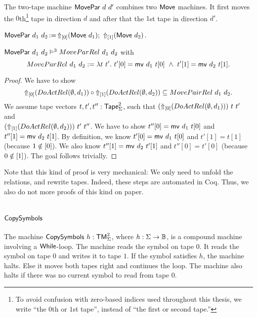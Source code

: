 The two-tape machine $\MS{MovePar}~d~d'$ combines two $\MS{Move}$ machines.  It first moves the $0$th\footnote{To avoid confusion with zero-based
  indices used throughout this thesis, we write ``the $0$th or $1$st tape'', instead of ``the first or second tape.''} tape in direction $d$ and after
that the $1$st tape in direction $d'$.
\begin{definition}[$\MS{MovePar}$]
  \label{def:MovePar}
  $\MS{MovePar}~d_1~d_2 \defop \LiftTapes{(\MS{Move}~d_1)}{\Vector{0}} \Seq \LiftTapes{(\MS{Move}~d_2)}{\Vector{1}}$.
\end{definition}
\begin{lemma}
  \label{lem:MovePar_Sem}
  $\MS{MovePar}~d_1~d_2 \RealiseIn3 MoveParRel~d_1~d_2$ with
  \[ MoveParRel~d_1~d_2 := \lambda t~t'.~t'[0]=\MS{mv}~d_1~t[0] ~\land~ t'[1]=\MS{mv}~d_2~t[1]. \]
\end{lemma}
\begin{proof}
  We have to show
  $$
    \LiftTapes{(DoActRel(\None,d_1))}{\Vector{0}} \circ
    \LiftTapes{(DoActRel(\None,d_2))}{\Vector{1}} \subseteq
    MovePairRel~d_1~d_2.
  $$
  We assume tape vectors $t, t', t'' : \Tape_\Sigma^2$, such that $(\LiftTapes{(DoActRel(\None,d_1))}{\Vector{0}})~t~t'$ and \\
  $(\LiftTapes{(DoActRel(\None,d_2))}{\Vector{1}})~t'~t''$.  We have to show $t''[0]=\MS{mv}~d_1~t[0]$ and $t''[1]=\MS{mv}~d_2~t[1]$.  By definition,
  we know $t'[0]=\MS{mv}~d_1~t[0]$ and $t'[1]=t[1]$ (because $1 \notin \Vector{0}$).  We also know $t''[1]=\MS{mv}~d_2~t'[1]$ and $t''[0]=t'[0]$
  (because $0 \notin \Vector{1}$).  The goal follows trivially.
\end{proof}
Note that this kind of proof is very mechanical: We only need to unfold the relations, and rewrite tapes.  Indeed, these steps are automated in Coq.
Thus, we also do not more proofs of this kind on paper.

\section{$\MS{CopySymbols}$}
\label{sec:CopySymbols}

The machine $\MS{CopySymbols}~h : \TM_\Sigma^2$, where $h:\Sigma\to\Bool$, is a compound machine involving a $\While$-loop.  The machine reads the
symbol on tape $0$.  It reads the symbol on tape $0$ and writes it to tape $1$.  If the symbol satisfies $h$, the machine halts.  Else it moves both
tapes right and continues the loop.  The machine also halts if there was no current symbol to read from tape $0$.

